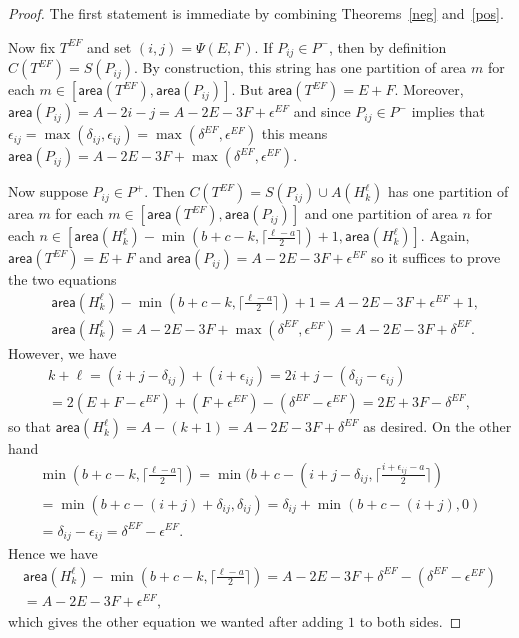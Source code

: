 \documentclass[11pt,reqno]{amsart}
\theoremstyle{definition}
\numberwithin{equation}{section}
\begin{document}
\begin{proof}
The first statement is immediate by combining Theorems~\ref{neg} and~\ref{pos}.  

Now fix $T^{EF}$ and set $(i,j)=\Psi(E,F)$.  If $P_{ij} \in P^-$, then by definition $C(T^{EF})=S(P_{ij})$. By construction, 
this string has one partition of area $m$ for each $m \in [\mathsf{area}(T^{EF}),\mathsf{area}(P_{ij})]$. But 
$\mathsf{area}(T^{EF})=E+F$.  Moreover, $\mathsf{area}(P_{ij})=A-2i-j=A-2E-3F + \epsilon^{EF}$ and since $P_{ij}\in P^-$ 
implies that $\epsilon_{ij}=\max(\delta_{ij},\epsilon_{ij})=\max(\delta^{EF},\epsilon^{EF})$ this means 
$\mathsf{area}(P_{ij})=A-2E-3F+\max(\delta^{EF},\epsilon^{EF})$.

Now suppose $P_{ij} \in P^+$.  Then $C(T^{EF})=S(P_{ij}) \cup A(H_k^\ell)$ has one partition of area $m$ for each 
$m \in [\mathsf{area}(T^{EF}),\mathsf{area}(P_{ij})]$ and one partition of area $n$ for each 
$n \in [\mathsf{area}(H_k^\ell)-\min(b+c-k,\lceil \frac{\ell-a}{2}\rceil)+1,\mathsf{area}(H_k^\ell)]$.  Again, $\mathsf{area}(T^{EF})=E+F$ 
and $\mathsf{area}(P_{ij})=A-2E-3F + \epsilon^{EF}$ so it suffices to prove the two equations
\begin{align*}
	&\mathsf{area}(H_k^\ell)-\min(b+c-k,\lceil \frac{\ell-a}{2}\rceil)+1=A-2E-3F + \epsilon^{EF}+1,\\
	&\mathsf{area}(H_k^\ell)=A-2E-3F+\max(\delta^{EF},\epsilon^{EF})=A-2E-3F+\delta^{EF}.
\end{align*}
However, we have
\begin{multline*}
	k+\ell=(i+j-\delta_{ij})+(i+\epsilon_{ij})=
	2i+j-(\delta_{ij}-\epsilon_{ij})\\
	=2(E+F-\epsilon^{EF})+(F+\epsilon^{EF})-(\delta^{EF}-\epsilon^{EF})=2E+3F-\delta^{EF},
\end{multline*}
so that $\mathsf{area}(H_k^\ell)=A-(k+1)=A-2E-3F+\delta^{EF}$ as desired. On the other hand
\begin{multline*}
	\min(b+c-k,\lceil \frac{\ell-a}{2}\rceil)=
	\min(b+c-(i+j-\delta_{ij},\lceil \frac{i+\epsilon_{ij}-a}{2}\rceil)\\
	=\min(b+c-(i+j)+\delta_{ij},\delta_{ij})=
	\delta_{ij} + \min(b+c-(i+j),0)\\ 
	=\delta_{ij}-\epsilon_{ij}=\delta^{EF}-\epsilon^{EF}.
\end{multline*}
Hence we have
\begin{multline*}
	\mathsf{area}(H_k^\ell)-\min(b+c-k,\lceil \frac{\ell-a}{2}\rceil)=A-2E-3F+\delta^{EF}-(\delta^{EF}-\epsilon^{EF})\\
	=A-2E-3F + \epsilon^{EF},
\end{multline*}
which gives the other equation we wanted after adding $1$ to both sides.
\end{proof}
\end{document}
